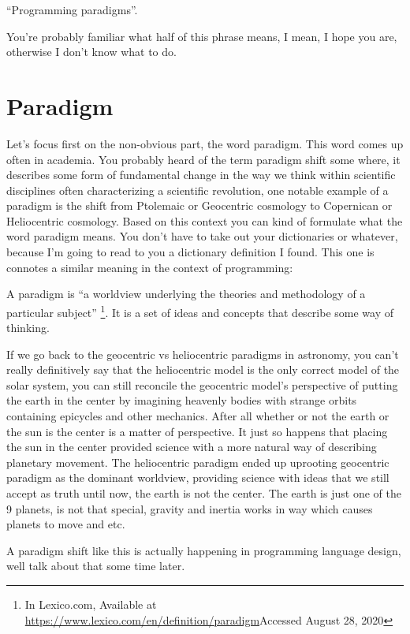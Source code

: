 ``Programming paradigms''.

You're probably familiar what half of this phrase means, I mean, I hope
you are, otherwise I don't know what to do.

\section{Paradigm}\label{programming-paradigms-introduction.md__paradigm}

Let's focus first on the non-obvious part, the word paradigm. This word
comes up often in academia. You probably heard of the term paradigm
shift some where, it describes some form of fundamental change in the
way we think within scientific disciplines often characterizing a
scientific revolution, one notable example of a paradigm is the shift
from Ptolemaic or Geocentric cosmology to Copernican or Heliocentric
cosmology. Based on this context you can kind of formulate what the word
paradigm means. You don't have to take out your dictionaries or
whatever, because I'm going to read to you a dictionary definition I
found. This one is connotes a similar meaning in the context of
programming:

A paradigm is ``a worldview underlying the theories and methodology of a
particular subject'' \footnote{In Lexico.com, Available at
  \href{https://www.lexico.com/en/definition/paradigm\%20Accessed\%20August\%2028}{https://www.lexico.com/en/definition/paradigm}Accessed
  August 28, 2020}. It is a set of ideas and concepts that describe some
way of thinking.

If we go back to the geocentric vs heliocentric paradigms in astronomy,
you can't really definitively say that the heliocentric model is the
only correct model of the solar system, you can still reconcile the
geocentric model's perspective of putting the earth in the center by
imagining heavenly bodies with strange orbits containing epicycles and
other mechanics. After all whether or not the earth or the sun is the
center is a matter of perspective. It just so happens that placing the
sun in the center provided science with a more natural way of describing
planetary movement. The heliocentric paradigm ended up uprooting
geocentric paradigm as the dominant worldview, providing science with
ideas that we still accept as truth until now, the earth is not the
center. The earth is just one of the 9 planets, is not that special,
gravity and inertia works in way which causes planets to move and etc.

A paradigm shift like this is actually happening in programming language
design, well talk about that some time later.

